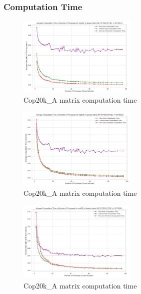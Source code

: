 \documentclass[12pt,oneside]{book} %
\begin{document}
\subsubsection{Computation Time}

\begin{figure}[H]
    \centering
    \includegraphics[width=0.5\textwidth]{../results/fat_vector_dim/cop20k_A_k1_computation_time.png}
    \caption{Cop20k\_A matrix computation time}\label{fig:cop20k-a-k1-computation-time}
\end{figure}

\begin{figure}[H]
    \centering
    \includegraphics[width=0.5\textwidth]{../results/fat_vector_dim/cop20k_A_k3_computation_time.png}
    \caption{Cop20k\_A matrix computation time}\label{fig:cop20k-a-k3-computation-time}
\end{figure}

\begin{figure}[H]
    \centering
    \includegraphics[width=0.5\textwidth]{../results/fat_vector_dim/cop20k_A_k6_computation_time.png}
    \caption{Cop20k\_A matrix computation time}\label{fig:cop20k-a-k6-computation-time}
\end{figure}
\end{document}
